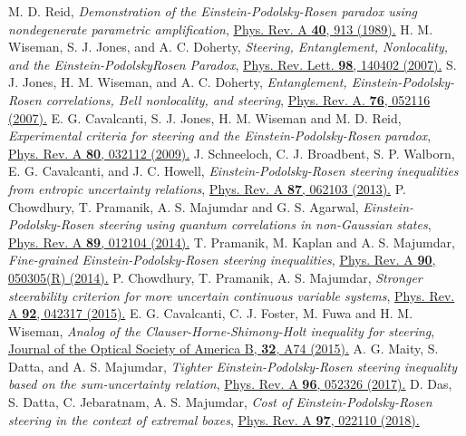 \documentclass[pra,a4paper,aps,twocolumn,showpacs,superscriptaddress,groupedaddress]{revtex4}
\begin{document}
\begin{thebibliography}{1}
 M. D. Reid, \emph{Demonstration of the Einstein-Podolsky-Rosen paradox using nondegenerate parametric amplification}, \href{https://journals.aps.org/pra/abstract/10.1103/PhysRevA.40.913}{Phys. Rev. A {\bf40}, 913 (1989).}
 H. M. Wiseman, S. J. Jones, and A. C. Doherty, \emph{Steering, Entanglement, Nonlocality, and the Einstein-PodolskyRosen Paradox}, \href{https://journals.aps.org/prl/abstract/10.1103/PhysRevLett.98.140402}{Phys. Rev. Lett. {\bf 98}, 140402 (2007).}
 S. J. Jones, H. M. Wiseman, and A. C. Doherty, \emph{Entanglement, Einstein-Podolsky-Rosen correlations, Bell nonlocality, and steering}, \href{https://journals.aps.org/pra/abstract/10.1103/PhysRevA.76.052116}{Phys. Rev. A. {\bf 76}, 052116 (2007).}
 E. G. Cavalcanti, S. J. Jones, H. M. Wiseman and M. D. Reid, \emph{Experimental criteria for steering and the Einstein-Podolsky-Rosen paradox}, \href{https://journals.aps.org/pra/abstract/10.1103/PhysRevA.80.032112}{Phys. Rev. A {\bf 80}, 032112 (2009).} 
 J. Schneeloch, C. J. Broadbent, S. P. Walborn, E. G. Cavalcanti, and J. C. Howell, \emph{Einstein-Podolsky-Rosen steering inequalities from entropic uncertainty relations}, \href{https://journals.aps.org/pra/abstract/10.1103/PhysRevA.87.062103}{Phys. Rev. A {\bf 87}, 062103 (2013).} 
 P. Chowdhury, T. Pramanik, A. S. Majumdar and G. S. Agarwal, 
\emph{Einstein-Podolsky-Rosen steering using quantum correlations in non-Gaussian states}, \href{https://journals.aps.org/pra/abstract/10.1103/PhysRevA.89.012104}{Phys. Rev. A {\bf 89}, 012104 (2014).}
 T. Pramanik, M. Kaplan and A. S. Majumdar, \emph{Fine-grained Einstein-Podolsky-Rosen steering inequalities}, \href{https://journals.aps.org/pra/abstract/10.1103/PhysRevA.90.050305}{Phys. Rev. A {\bf 90}, 050305(R) (2014).} 
 P. Chowdhury, T. Pramanik, A. S. Majumdar, \emph{Stronger steerability criterion for more uncertain continuous variable systems},  \href{https://journals.aps.org/pra/abstract/10.1103/PhysRevA.92.042317}{Phys. Rev. 
A {\bf 92}, 042317 (2015).}
 E. G. Cavalcanti, C. J. Foster, M. Fuwa and H. M. Wiseman, \emph{Analog of the Clauser-Horne-Shimony-Holt inequality for steering}, \href{https://www.osapublishing.org/josab/abstract.cfm?uri=josab-32-4-A74}{ Journal of the Optical Society of America B, {\bf 32}, A74 (2015).}
 A. G. Maity, S. Datta, and A. S. Majumdar, \emph{Tighter Einstein-Podolsky-Rosen steering inequality based on the sum-uncertainty relation}, \href{https://journals.aps.org/pra/abstract/10.1103/PhysRevA.96.052326}{Phys. Rev. A {\bf 96}, 052326 (2017).}
 D. Das, S. Datta, C. Jebaratnam, A. S. Majumdar, \emph{Cost of Einstein-Podolsky-Rosen steering in the context of extremal boxes}, \href{https://journals.aps.org/pra/abstract/10.1103/PhysRevA.97.022110}{Phys. Rev. A \textbf{97}, 022110 (2018).}


\end{thebibliography}
\end{document}
